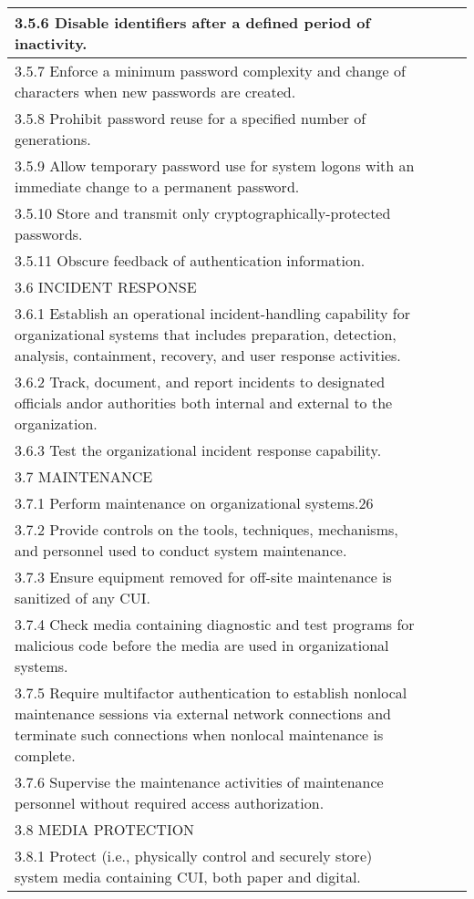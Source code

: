 \begin{longtable} {|p{}|p{}|p{}|p{} |}
{3.5.6 Disable identifiers after a defined period of inactivity.}&&& \\ \hline
{3.5.7 Enforce a minimum password complexity and change of characters when new passwords are created.}&&& \\ \hline
{3.5.8 Prohibit password reuse for a specified number of generations.}&&& \\ \hline
{3.5.9 Allow temporary password use for system logons with an immediate change to a permanent password.}&&& \\ \hline
{3.5.10 Store and transmit only cryptographically-protected passwords.}&&& \\ \hline
{3.5.11 Obscure feedback of authentication information.}&&& \\ \hline
{3.6 INCIDENT RESPONSE}&&& \\ \hline
{3.6.1 Establish an operational incident-handling capability for organizational systems that includes preparation, detection, analysis, containment, recovery, and user response activities.}&&& \\ \hline
{3.6.2 Track, document, and report incidents to designated officials and\/or authorities both internal and external to the organization.}&&& \\ \hline
{3.6.3 Test the organizational incident response capability.}&&& \\ \hline
{3.7 MAINTENANCE}&&& \\ \hline
{3.7.1 Perform maintenance on organizational systems.26}&&& \\ \hline
{3.7.2 Provide controls on the tools, techniques, mechanisms, and personnel used to conduct system maintenance.}&&& \\ \hline
{3.7.3 Ensure equipment removed for off-site maintenance is sanitized of any CUI.}&&& \\ \hline
{3.7.4 Check media containing diagnostic and test programs for malicious code before the media are used in organizational systems.}&&& \\ \hline
{3.7.5 Require multifactor authentication to establish nonlocal maintenance sessions via external network connections and terminate such connections when nonlocal maintenance is complete.}&&& \\ \hline
{3.7.6 Supervise the maintenance activities of maintenance personnel without required access authorization.}&&& \\ \hline
{3.8 MEDIA PROTECTION}&&& \\ \hline
{3.8.1 Protect (i.e., physically control and securely store) system media containing CUI, both paper and digital.}&&& \\ \hline

\end{longtable}
